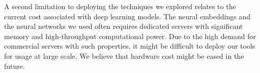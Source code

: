 A second limitation to deploying the techniques we explored
relates to the current cost associated with deep learning models. 
The neural embeddings and the neural networks we used
 often requires dedicated servers with significant 
memory and high-throughput computational power.
 Due to the high demand for commercial servers with such properties, 
 it might be difficult to deploy our tools for usage at large scale.
We believe that hardware cost might be eased in the future.




